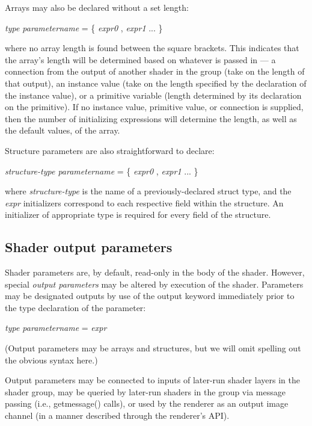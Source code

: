 \documentclass[11pt,letterpaper]{book}
\begin{document}
Arrays may also be declared without a set length:

\medskip
\spc \emph{type parametername} {\cf [ ] = \{ } \emph{expr0}
  {\cf ,} \emph{expr1} ... {\cf \} }
\medskip

\noindent where no array length is found between the square brackets.
This indicates that the array's length will be determined based on
whatever is passed in --- a connection from the output of another shader
in the group (take on the length of that output), an instance value
(take on the length specified by the declaration of the instance value),
or a primitive variable (length determined by its declaration on the
primitive).  If no instance value, primitive value, or connection is
supplied, then the number of initializing expressions will determine the
length, as well as the default values, of the array.

Structure parameters are also straightforward to declare:

\medskip
\spc \emph{structure-type parametername} {\cf = \{ } \emph{expr0}
  {\cf ,} \emph{expr1} ... {\cf \} }
\medskip

\noindent where \emph{structure-type} is the name of a
previously-declared {\cf struct} type, and the \emph{expr} initializers
correspond to each respective field within the structure.  An
initializer of appropriate type is required for every field of the
structure.

\subsection{Shader output parameters}
 

Shader parameters are, by default, read-only in the body of the
shader.  However, special \emph{output parameters} may be altered
by execution of the shader.  Parameters may be designated outputs
by use of the {\cf output} keyword immediately prior to the
type declaration of the parameter:

\medskip
{} \emph{type parametername} {\cf = } \emph{expr}
\medskip

\noindent (Output parameters may be arrays and structures, but we will
omit spelling out the obvious syntax here.)

Output parameters may be connected to inputs of later-run shader layers
in the shader group, may be queried by later-run shaders in the group
via message passing (i.e., {\cf getmessage()} calls), or used by the
renderer as an output image channel (in a manner described through the
renderer's API).
\end{document}
